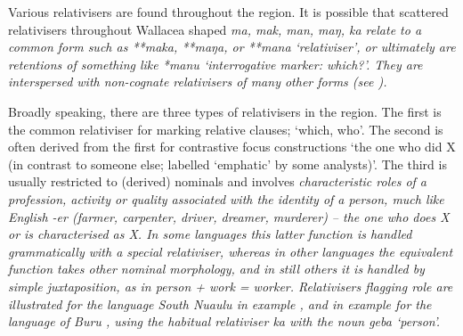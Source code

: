 Various relativisers are found throughout the region.
It is possible that scattered relativisers throughout Wallacea
shaped \it{ma, mak, man, maŋ, ka} relate to a common form such as **maka,
**maŋa, or **mana ‘relativiser’, or ultimately are retentions
of something like  *manu ‘interrogative marker: which?’.
They are interspersed with non-cognate relativisers of many other forms (see ).

Broadly speaking, there are three types of relativisers in the region.
The first is the common relativiser for marking relative clauses; ‘which, who’.
The second is often derived from the first for contrastive focus
constructions ‘the one who did X (in contrast to someone else;
labelled ‘emphatic’ by some analysts)’.
The third is usually restricted to (derived) nominals
and involves \it{characteristic roles} of a profession,
activity or quality associated with the identity of a person,
much like English \it{-er} (\it{farmer,
carpenter, driver, dreamer, murderer}) -- the one who does X or
is characterised as X.
In some languages this latter function is handled grammatically
with a special relativiser,
whereas in other languages the equivalent function takes other
nominal morphology, and in still others it is handled by simple juxtaposition,
as in \it{person + work = worker}.
Relativisers flagging role are illustrated for the 
language South Nuaulu \citep[61--63,
77f, 164--170]{Bolton1990} in example ,
and in example 
for the  language of Buru \citep[183, 429--436]{Grimes1991c},
using the habitual relativiser \it{ka} with the noun \it{geba} ‘person’.


